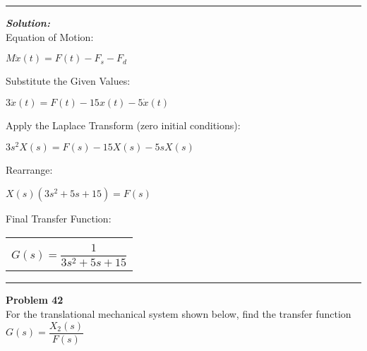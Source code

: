 \documentclass[11pt,letterpaper]{article}
\begin{document}
\rule{\textwidth}{1pt}
\vspace{12pt}
\textit{\textbf{Solution:}}\\
Equation of Motion:\\
\begin{center}
	$M\ddot{x}(t)=F(t)-F_{s}-F_{d}$\\[12pt]
\end{center}
Substitute the Given Values:\\
\begin{center}
	$3\ddot{x}(t)=F(t)-15x(t)-5\dot{x}(t)$\\
\end{center}
Apply the Laplace Transform (zero initial conditions):\\
\begin{center}
	$3s^2X(s)=F(s)-15X(s)-5sX(s)$\\[12pt]
\end{center}
Rearrange:\\
\begin{center}
	$X(s)(3s^2+5s+15)=F(s)$\\
\end{center}
Final Transfer Function:\\
\begin{center}
	\begin{tabular}{|c|}
		\hline \\
		$G(s)=\dfrac{1}{3s^2+5s+15}$\\[12pt]
		\hline
	\end{tabular}	
\end{center}

\clearpage
\rule{\textwidth}{1pt}
\textbf{Problem 42}\\
For the translational mechanical system shown below, find the transfer function $G(s)=\dfrac{X_2(s)}{F(s)}$\\
\end{document}
